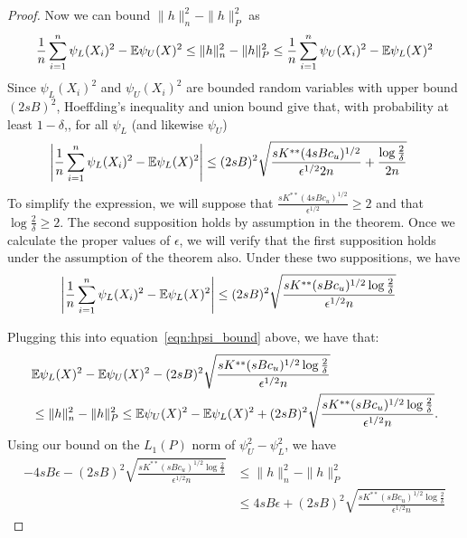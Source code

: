 \documentclass[12pt,pdftex,aos,noinfoline,addressasfootnote]{imsart}
\begin{document}
\begin{proof}
Now we can bound $\| h \|_n^2 - \| h \|_P^2$ as
\begin{align}
\frac{1}{n} \sum_{i=1}^n \psi_L(X_i)^2 - {\mathbb E} \psi_U(X)^2  \leq
    \| h \|_n^2 - \| h \|_P^2 \leq
  \frac{1}{n} \sum_{i=1}^n \psi_U(X_i)^2 - {\mathbb E} \psi_L(X)^2  \label{eqn:hpsi_bound}
\end{align}
Since 
$\psi_L(X_i)^2$ and $\psi_U(X_i)^2$ are bounded random variables with
upper bound $(2sB)^2$, Hoeffding's inequality and union bound give that,
with probability at least $1-\delta$,, for all $\psi_L$ (and likewise $\psi_U$)
\begin{align*}
\left| \frac{1}{n} \sum_{i=1}^n \psi_L(X_i)^2 - 
   {\mathbb E} \psi_L(X)^2 \right| &\leq (2sB)^2 \sqrt{ \frac{sK^{**} (4sBc_u)^{1/2}}{\epsilon^{1/2}2n} + \frac{\log\frac{2}{\delta}}{2n}} 
\end{align*}
To simplify the expression, we will suppose that $\frac{sK^{**} (4sBc_u)^{1/2}}{\epsilon^{1/2}} \geq 2$ and that $\log \frac{2}{\delta} \geq 2$. The second supposition holds by assumption in the theorem. Once we calculate the proper values of $\epsilon$, we will verify that the first supposition holds under the assumption of the theorem also. Under these two suppositions, we have
\begin{align}
\label{eqn:simplified_psi_concentration}
\left| \frac{1}{n} \sum_{i=1}^n \psi_L(X_i)^2 - 
   {\mathbb E} \psi_L(X)^2 \right| &\leq (2sB)^2 \sqrt{ \frac{ sK^{**} (sBc_u)^{1/2} \log \frac{2}{\delta}}{ \epsilon^{1/2} n} }
\end{align}

Plugging this into equation~\eqref{eqn:hpsi_bound} above, we have that:
\begin{align*}
& {\mathbb E} \psi_L(X)^2 - {\mathbb E} \psi_U(X)^2 - 
(2sB)^2 \sqrt{ \frac{ sK^{**} (sBc_u)^{1/2} \log \frac{2}{\delta}}{ \epsilon^{1/2} n} } \\
 & \leq 
 \| h \|_n^2 - \| h \|_P^2 \leq
{\mathbb E} \psi_U(X)^2 - {\mathbb E} \psi_L(X)^2 + 
(2sB)^2 \sqrt{ \frac{ sK^{**} (sBc_u)^{1/2} \log \frac{2}{\delta}}{ \epsilon^{1/2} n} }.
\end{align*}
Using our bound on the $L_1(P)$ norm of $\psi_U^2 - \psi_L^2$, we have
\begin{align*}
-4sB\epsilon - 
(2sB)^2 \sqrt{ \frac{ sK^{**} (sBc_u)^{1/2} \log \frac{2}{\delta}}{ \epsilon^{1/2} n} } &\leq 
 \| h \|_n^2 - \| h \|_P^2 \\
& \leq 4sB\epsilon + 
(2sB)^2 \sqrt{ \frac{ sK^{**} (sBc_u)^{1/2} \log \frac{2}{\delta}}{ \epsilon^{1/2} n} }
\end{align*}


\end{proof}
\end{document}
